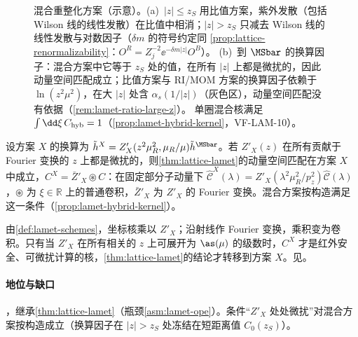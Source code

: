 \begin{figure}[htbp]
\caption{混合重整化方案（示意）。(a)~$|z|\le z_S$ 用比值方案，紫外发散（包括 Wilson 线的线性发散）在比值中相消；$|z|>z_S$ 只减去 Wilson 线的线性发散与对数因子（$\delta m$ 的符号约定同 \cref{prop:lattice-renormalizability}：$O^R=Z_j^{-2}\ee^{-\delta m|z|}O^B$）。
(b)~到 $\MSbar$ 的换算因子：混合方案中它等于 $z_S$ 处的值，在所有 $|z|$ 上都是微扰的，因此动量空间匹配成立；比值方案与 RI/MOM 方案的换算因子依赖于 $\ln(z^2\mu^2)$，在大 $|z|$ 处含 $\alpha_s(1/|z|)$（灰色区），动量空间匹配没有依据（\cref{rem:lamet-ratio-large-z}）。
单圈混合核满足 $\int\dd\xi\,C_{\rm hyb}=1$（\cref{prop:lamet-hybrid-kernel}，VF-LAM-10）。}
\label{fig:lamet-hybrid}
\end{figure}
\begin{proposition}\label{prop:lamet-scheme-validity}
设方案 $X$ 的换算为 $\tilde h^X=Z'_X(z^2\mu_R^2,\mu_R/\mu)\tilde h^{\MSbar}$。若 $Z'_X(z)$ 在所有贡献于 Fourier 变换的 $z$ 上都是微扰的，则\cref{thm:lattice-lamet}的动量空间匹配在方案 $X$ 中成立，$C^X=\bar Z'_X\circledast C$：在固定部分子动量下 $\hat{\mathcal C}^X(\lambda)=Z'_X(\lambda^2\mu_R^2/p_z^2)\hat{\mathcal C}(\lambda)$，$\circledast$ 为 $\xi\in\mathbb R$ 上的普通卷积，$\bar Z'_X$ 为 $Z'_X$ 的 Fourier 变换。混合方案按构造满足这一条件（\cref{prop:lamet-hybrid-kernel}）。
\end{proposition}

\begin{proofsketch}
由\cref{def:lamet-schemes}，坐标核乘以 $Z'_X$；沿射线作 Fourier 变换，乘积变为卷积。只有当 $Z'_X$ 在所有相关的 $z$ 上可展开为 $\as(\mu)$ 的级数时，$C^X$ 才是红外安全、可微扰计算的核，\cref{thm:lattice-lamet}的结论才转移到方案 $X$。见\cite{JiEtAl2021,Ji:2020brr}。
\end{proofsketch}

\paragraph{地位与缺口}
\tagA，继承\cref{thm:lattice-lamet}（瓶颈\cref{asm:lamet-ope}）。条件“$Z'_X$ 处处微扰”对混合方案按构造成立（换算因子在 $|z|>z_S$ 处冻结在短距离值 $C_0(z_S)$）。

